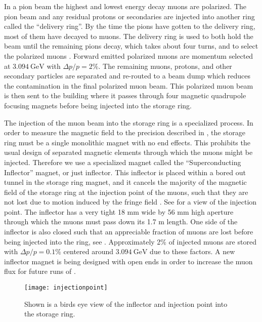 In a pion beam the highest and lowest energy decay muons are polarized. The pion beam and any residual protons or secondaries are injected into another ring called the ``delivery ring''. By the time the pions have gotten to the delivery ring, most of them have decayed to muons. The delivery ring is used to both hold the beam until the remaining pions decay, which takes about four turns, and to select the polarized muons \cite{Stratakis:2017uci}. Forward emitted polarized muons are momentum selected at $\SI{3.094}{\GeV}$ with $\Delta p / p = 2\%$. The remaining muons, protons, and other secondary particles are separated and re-routed to a beam dump which reduces the contamination in the final polarized muon beam. This polarized muon beam is then sent to the \gmtwo building where it passes through four magnetic quadrupole focusing magnets before being injected into the storage ring.

The injection of the muon beam into the \gmtwo storage ring is a specialized process. In order to measure the magnetic field to the precision described in , the \gmtwo storage ring must be a single monolithic magnet with no end effects. This prohibits the usual design of separated magnetic elements through which the muons might be injected. Therefore we use a specialized magnet called the ``Superconducting Inflector'' magnet, or just inflector. This inflector is placed within a bored out tunnel in the storage ring magnet, and it cancels the majority of the magnetic field of the storage ring at the injection point of the muons, such that they are not lost due to motion induced by the fringe field \cite{inflector}. See  for a view of the injection point. The inflector has a very tight 18 mm wide by 56 mm high aperture through which the muons must pass down its 1.7 m length. One side of the inflector is also closed such that an appreciable fraction of muons are lost before being injected into the ring, see . Approximately 2\% of injected muons are stored with $\Delta p / p = 0.1\%$ centered around $\SI{3.094}{\GeV}$ due to these factors. A new inflector magnet is being designed with open ends in order to increase the muon flux for future runs of \gmtwo \cite{TDR}.


\begin{figure}[]
    \centering
    \texttt{[image: injectionpoint]}
    \caption[Muon injection point through inflector]{Shown is a birds eye view of the inflector and injection point into the storage ring.}   
    \label{fig:injectionpoint}
\end{figure}

